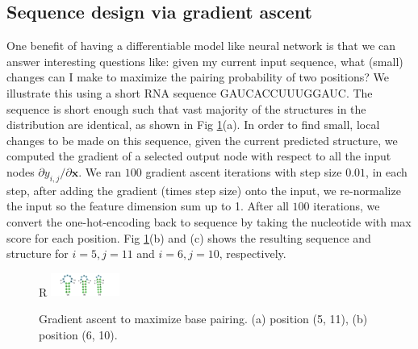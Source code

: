 \documentclass{article}
\begin{document}
%
%

\subsection{Sequence design via gradient ascent}

One benefit of having a differentiable model like neural network is that we can answer interesting questions like:
given my current input sequence, what (small) changes can I make to maximize the pairing probability of two positions?
We illustrate this using a short RNA sequence GAUCACCUUUGGAUC.
The sequence is short enough such that vast majority of the structures in the distribution are identical,
as shown in Fig \ref{fig:gradient_ascent}(a).
In order to find small, local changes to be made on this sequence,
given the current predicted structure,
we computed the gradient of a selected output node
with respect to all the input nodes ${\partial y_{i,j}}/{\partial \bm{x}}$.
We ran $100$ gradient ascent iterations with step size $0.01$,
in each step, after adding the gradient (times step size) onto the input,
we re-normalize the input so the feature dimension sum up to 1.
After all $100$ iterations, we convert the one-hot-encoding back to sequence
by taking the nucleotide with max score for each position.
Fig \ref{fig:gradient_ascent}(b) and (c) shows the resulting sequence and structure
for $i=5, j=11$ and $i=6, j=10$, respectively.



\begin{figure}{R}
    \centering
    \includegraphics[width=0.2\textwidth]{plot/gradient_ascent.pdf}
    \caption{Gradient ascent to maximize base pairing. (a) position (5, 11), (b) position (6, 10).}
    \label{fig:gradient_ascent}
    \centering
\end{figure}



\end{document}
